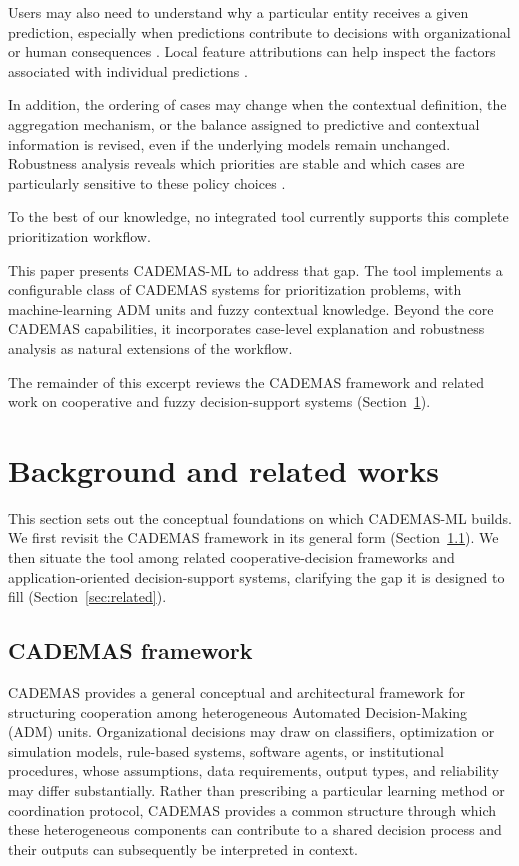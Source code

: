 Users may also need to understand why a particular entity receives a given prediction, especially when predictions contribute to decisions with organizational or human consequences \citep{Arrieta2020}. Local feature attributions can help inspect the factors associated with individual predictions \citep{Lundberg2017,Lundberg2020}.

In addition, the ordering of cases may change when the contextual definition, the aggregation mechanism, or the balance assigned to predictive and contextual information is revised, even if the underlying models remain unchanged. Robustness analysis reveals which priorities are stable and which cases are particularly sensitive to these policy choices \citep{Arrieta2020}.

To the best of our knowledge, no integrated tool currently supports this complete prioritization workflow.

This paper presents CADEMAS-ML to address that gap. The tool implements a configurable class of CADEMAS systems for prioritization problems, with machine-learning ADM units and fuzzy contextual knowledge. Beyond the core CADEMAS capabilities, it incorporates case-level explanation and robustness analysis as natural extensions of the workflow.


The remainder of this excerpt reviews the CADEMAS framework and related work on cooperative and fuzzy decision-support systems (Section~\ref{sec:background}).


\section{Background and related works}\label{sec:background}

This section sets out the conceptual foundations on which CADEMAS-ML builds. We first revisit the CADEMAS framework in its general form (Section~\ref{sec:cademas}). We then situate the tool among related cooperative-decision frameworks and application-oriented decision-support systems, clarifying the gap it is designed to fill (Section~\ref{sec:related}).

\subsection{CADEMAS framework}\label{sec:cademas}

CADEMAS \citep{NovoaHernandez2026} provides a general conceptual and architectural framework for structuring cooperation among heterogeneous Automated Decision-Making (ADM) units. Organizational decisions may draw on classifiers, optimization or simulation models, rule-based systems, software agents, or institutional procedures, whose assumptions, data requirements, output types, and reliability may differ substantially. Rather than prescribing a particular learning method or coordination protocol, CADEMAS provides a common structure through which these heterogeneous components can contribute to a shared decision process and their outputs can subsequently be interpreted in context.

